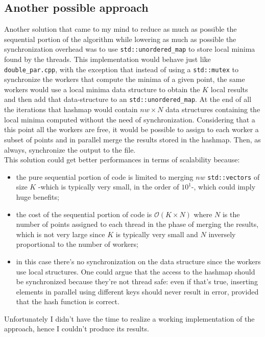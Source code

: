 \documentclass[12pt, letterpaper]{article}  %
\newcommand{\bigO}{\mathcal{O}}
\begin{document}
\subsection{Another possible approach}
Another solution that came to my mind to reduce as much as possible the sequential portion of the algorithm while lowering as much as possible the synchronization overhead was to use \texttt{std::unordered\_map} to store local minima found by the threads. This implementation would behave just like \texttt{double\_par.cpp}, with the exception that instead of using a \texttt{std::mutex} to synchronize the workers that compute the minima of a given point, the same workers would use a local minima data structure to obtain the $K$ local results and then add that data-structure to an \texttt{std::unordered\_map}. At the end of all the iterations that hashmap would contain $nw \times N$ data structures containing the local minima computed without the need of synchronization. Considering that a this point all the workers are free, it would be possible to assign to each worker a subset of points and in parallel merge the results stored in the hashmap. Then, as always, synchronize the output to the file.\\
This solution could get better performances in terms of scalability because: 
\begin{itemize}
    \item the pure sequential portion of code is limited to merging $nw$ \texttt{std::vectors} of size $K$ -which is typically very small, in the order of $10^1$-, which could imply huge benefits;
    \item the cost of the sequential portion of code is $\bigO(K \times N)$ where $N$ is the number of points assigned to each thread in the phase of merging the results, which is not very large since $K$ is typically very small and $N$ inversely proportional to the number of workers;
    \item in this case there's no synchronization on the data structure since the workers use local structures. One could argue that the access to the hashmap should be synchronized because they're not thread safe: even if that's true, inserting elements in parallel using different keys should never result in error, provided that the hash function is correct.   
\end{itemize}

Unfortunately I didn't have the time to realize a working implementation of the approach, hence I couldn't produce its results.
\end{document}
